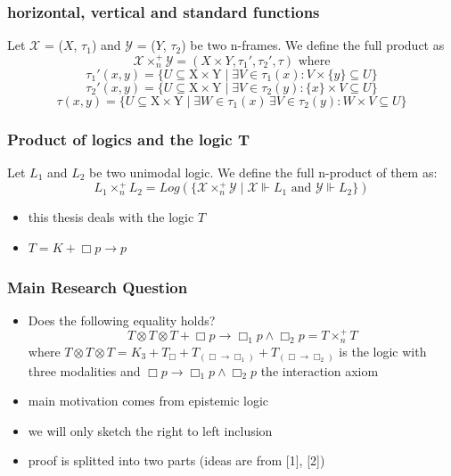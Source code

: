 \documentclass[hyperref={pdfpagelabels=false},t,10pt]{beamer}
\begin{document}
\begin{frame}
  \frametitle{horizontal, vertical and standard functions}
  Let $\mathcal{X}$ = ($X$, $\tau_1$) and $\mathcal{Y}$ = ($Y$, $\tau_2$) be two n-frames. We define the full product as
    $$\mathcal{X} \times_n^+  \mathcal{Y} = (X \times Y, \tau_1', \tau_2', \tau) \text{ where}$$
    $$ \tau_1'(x,y) = \{ U \subseteq \mbox{X} \times \mbox{Y} \mid \exists V \in \tau_1(x) : V \times  \{ y \} \subseteq U \}$$
    $$ \tau_2'(x,y) = \{ U \subseteq \mbox{X} \times \mbox{Y} \mid \exists V \in \tau_2(y) : \{ x \} \times V \subseteq U \}$$
        $$ \tau(x,y) = \{ U \subseteq \mbox{X} \times \mbox{Y} \mid \exists W \in \tau_1(x) \, \exists V \in \tau_2(y) : W \times V \subseteq U \}$$   
\end{frame}

\begin{frame}
  \frametitle{Product of logics and the logic T}
  Let $L_1$ and $L_2$ be two unimodal logic. We define the full n-product of them as:
  $$L_1 \times_n^+ L_2 =  Log(\{\mathcal{X} \times_n^+ \mathcal{Y} \mid \mathcal{X} \Vdash L_1 \text{ and } \mathcal{Y} \Vdash L_2 \})$$ \pause
  \begin{itemize}
    \item this thesis deals with the logic $T$
    \item $T = K + \Box p \rightarrow p$
  \end{itemize}
\end{frame}

\begin{frame}
  \frametitle{Main Research Question}
  \begin{itemize}
    \item Does the following equality holds? 
    $$T \otimes T \otimes T + \Box p \rightarrow \Box_1 p \land \Box_2 p = T \times_n^+ T$$
    where $T \otimes T \otimes T = K_3 + T_{\Box} + T_{(\Box \rightarrow \Box_1)} + T_{(\Box \rightarrow \Box_2)}$ is the logic with three modalities 
    and $\Box p \rightarrow \Box_1 p \land \Box_2 p$ the interaction axiom \pause
    \item main motivation comes from epistemic logic 
    \item we will only sketch the right to left inclusion
    \item proof is splitted into two parts (ideas are from [1], [2])
  \end{itemize}
\end{frame}
\end{document}
